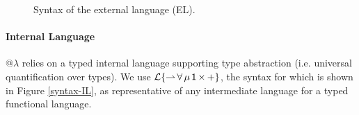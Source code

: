 \documentclass[10pt,preprint]{sigplanconf}
\begin{document}


\begin{figure}[t]
\small
\hspace{-5px}
\caption{Syntax of the external language (EL).}
\label{syntax-EL}\vspace{-5px}
\end{figure}



\paragraph{Internal Language} 
@$\lambda$ relies on a typed internal language supporting type abstraction (i.e. universal quantification over types). We use {$\mathcal{L}\{{\rightharpoonup}\,{\forall}\,{\mu}\,{{\sf 1}}\,{\times}\,{+}\}$}, the syntax for which is shown in Figure \ref{syntax-IL}, as representative of any intermediate language for a typed functional language. %
\end{document}
